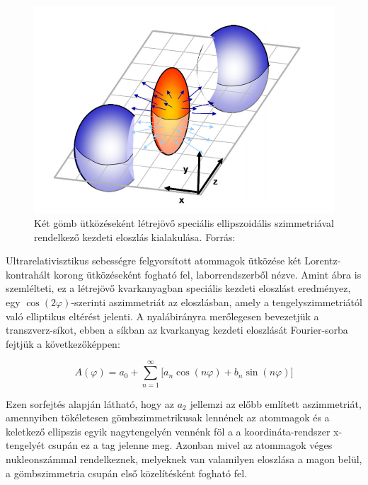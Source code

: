 \documentclass[11pt,a4paper]{article}
\numberwithin{equation}{subsection}
\numberwithin{figure}{section}
\begin{document}
\begin{center}
\begin{figure}[H]
\centering
\includegraphics[scale=0.6]{pic/int/p2}
\caption{Két gömb ütközéseként létrejövő speciális ellipszoidális szimmetriával rendelkező kezdeti eloszlás kialakulása. Forrás: ~\cite{CsanadHabil}
}
\label{fig:ellip}
\end{figure}
\end{center}



Ultrarelativisztikus sebességre felgyorsított atommagok ütközése két Lorentz-kontrahált korong ütközéseként fogható fel, laborrendszerből nézve. Amint  ábra is szemlélteti, ez a létrejövő kvarkanyagban speciális kezdeti eloszlást eredményez, egy $\cos(2\varphi)$-szerinti aszimmetriát az eloszlásban, amely a tengelyszimmetriától való elliptikus eltérést jelenti.
A nyalábirányra merőlegesen bevezetjük a transzverz-síkot, ebben a síkban az kvarkanyag kezdeti eloszlását Fourier-sorba fejtjük a következőképpen:
\begin{large}
\begin{equation}
A(\varphi)= a_0+\sum_{n=1}^{\infty}\Big[a_n \cos(n\varphi)+b_n \sin(n\varphi)\Big]
\label{eq:e2}
\end{equation}
\end{large}
Ezen sorfejtés alapján látható, hogy az $a_2$ jellemzi az előbb említett aszimmetriát, amennyiben tökéletesen gömbszimmetrikusak lennének az atommagok és a keletkező ellipszis egyik nagytengelyén vennénk föl a a koordináta-rendszer x-tengelyét csupán ez a tag jelenne meg. Azonban mivel az atommagok véges nukleonszámmal rendelkeznek, melyeknek van valamilyen eloszlása a magon belül, a gömbszimmetria csupán első közelítésként fogható fel.
\end{document}
